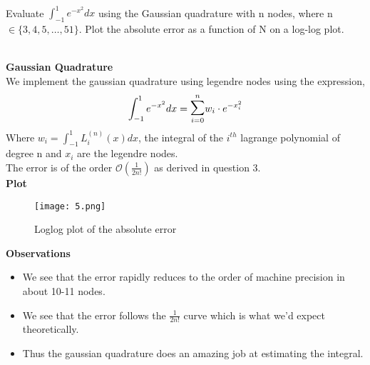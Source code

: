 \documentclass[letterpaper]{exam}
\begin{document}
\begin{questions}
\\
Evaluate $\int_{-1}^{1}e^{-x^2} dx$ using the Gaussian quadrature with n nodes, where n $\in \{ 3,4,5,\ldots,51\}$. Plot the absolute error as a function of N on a log-log plot.
\begin{solution}
\\
\textbf{Gaussian Quadrature}\\
We implement the gaussian quadrature using legendre nodes using the expression,
\begin{align}
   \int_{-1}^{1}e^{-x^2} dx = \overset{n}{\underset{i = 0}{\mathlarger{\mathlarger{\sum}}}} w_i\cdot e^{-x_i^2} 
\end{align}
Where $w_i = \int_{-1}^{1} L_i^{(n)}(x) dx$, the integral of the $i^{th}$ lagrange polynomial of degree n and $x_i$ are the legendre nodes.\\
The error is of the order $\mathcal{O}\left(\frac{1}{2n!}\right)$ as derived in question 3.\\
\textbf{Plot}
\begin{figure}[H]
\centering
\texttt{[image: 5.png]}
\label{Fig5}
\caption{Loglog plot of the absolute error}
\end{figure}
\textbf{Observations}
\begin{itemize}
    \item We see that the error rapidly reduces to the order of machine precision in about 10-11 nodes.
    \item We see that the error follows the $\frac{1}{2n!}$ curve which is what we'd expect theoretically.
    \item Thus the gaussian quadrature does an amazing job at estimating the integral.
\end{itemize}
\end{solution}
\end{questions}
\end{document}
